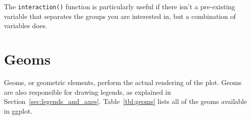 % 


% 

 
% 


The {\tt interaction()} function is particularly useful if there isn't a pre-existing variable that separates the groups you are interested in, but a combination of variables does.  

\section{Geoms}
\label{sec:geom}

Geoms, or geometric elements, perform the actual rendering of the plot. Geoms are also responsible for drawing legends, as explained in Section~\ref{sec:legends_and_axes}.  Table~\ref{tbl:geoms} lists all of the geoms available in ggplot.  

